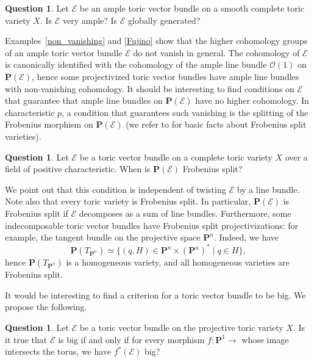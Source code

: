 \documentclass[12pt]{amsart}
\theoremstyle{definition}
\newtheorem{question}[lemma]{Question}
\theoremstyle{remark}
\begin{document}
\begin{question}\label{q2}
Let ${\mathcal{E}}$ be an ample toric vector bundle on a smooth complete toric
variety $X$. Is ${\mathcal{E}}$ very ample? Is ${\mathcal{E}}$ globally generated?
\end{question}

 Examples~\ref{non_vanishing} and \ref{Fujino} show that the higher cohomology groups of an ample toric vector bundle
 ${\mathcal{E}}$
 do not vanish in general. The cohomology of ${\mathcal{E}}$ is canonically identified with the cohomology
 of the ample line bundle ${\mathcal{O}}(1)$ on ${{\mathbf P}}({\mathcal{E}})$, hence some projectivized toric vector bundles have ample line bundles with non-vanishing cohomology. It should be interesting to find conditions on 
 ${\mathcal{E}}$ that guarantee that  ample line bundles on ${{\mathbf P}}({\mathcal{E}})$ have no higher cohomology. In characteristic 
 $p$, a condition that guarantees such vanishing is the splitting of the Frobenius morphism on
 ${{\mathbf P}}({\mathcal{E}})$ (we refer to \cite{BK} for basic facts about Frobenius split varieties). 

\begin{question}
Let ${\mathcal{E}}$ be a toric vector bundle on a complete toric variety $X$ over a field
of positive characteristic. When is ${{\mathbf P}}({\mathcal{E}})$ Frobenius split?
\end{question}

\noindent We point out that this condition is independent of twisting ${\mathcal{E}}$ by a line bundle. 
Note also that every toric variety is Frobenius split. In particular, ${{\mathbf P}}({\mathcal{E}})$ is Frobenius split
if ${\mathcal{E}}$ decomposes as a sum of line bundles. Furthermore, some indecomposable toric
vector bundles have Frobenius split projectivizations: for example, the tangent bundle on the projective
space ${{\mathbf P}}^n$. Indeed,
 we have 
 $${{\mathbf P}}(T_{{{\mathbf P}}^n})\simeq\{(q,H)\in{{\mathbf P}}^n\times ({{\mathbf P}}^n)^*\mid q\in H\},$$
 hence ${{\mathbf P}}(T_{{{\mathbf P}}^n})$ is a homogeneous variety, and all homogeneous varieties are Frobenius split.
 

\bigskip

It would be interesting to find a criterion for a toric vector
bundle to be big. We propose the following.

\begin{question}\label{q5}
Let ${\mathcal{E}}$ be a toric vector bundle on the projective toric variety
$X$. Is it true that ${\mathcal{E}}$ is big if and only if for every morphism
$f\colon{{\mathbf P}}^1{\xrightarrow{\ \ }}$ whose image intersects the torus, we have
$f^*({\mathcal{E}})$ big?
\end{question}
\end{document}
